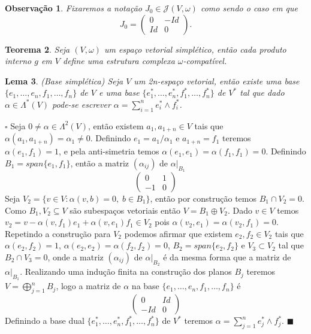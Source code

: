 \documentclass[12pt]{book}
\newtheorem{teorema}{Teorema}[section]
\newtheorem{lema}[teorema]{Lema}
\newtheorem{observacao}[teorema]{Observação}
\newenvironment{prova}[1]{$\square$ #1}{\hfill$\blacksquare$}
\newcommand{\estruturacomplexa}{J_{0}}
\newcommand{\estruturascomplexaspadrao}{\mathcal{J}(V, \omega)}
\newcommand{\vermelho}[1]{{\color{red}#1}}
\begin{document}
	\begin{observacao}\label{observacao_estrutura_complexa}
		Fixaremos a notação $\estruturacomplexa \in \estruturascomplexaspadrao$ como sendo o caso em que
		$$
		\estruturacomplexa=
		\left(
		\begin{array}{cc}
		0 & -Id
		\\
		Id & 0
		\end{array}
		\right).
		$$
	\end{observacao}
	
	\begin{teorema}
		\vermelho{
			Seja $(V, \omega)$ um espaço vetorial simplético, então cada produto interno $g$ em $V$ define uma estrutura complexa $\omega$-compatível.}
	\end{teorema}
	
	\begin{lema}
		(Base simplética) Seja $V$ um 2n-espaço vetorial, então existe uma base $\{ e_{1},\dots, e_{n}, f_{1},\dots, f_{n}\}$ de $V$ e uma base $\{e_{1}^{*}, \dots, e_{n}^{*}, f_{1}^{*}, \dots,f_{n}^{*}\}$ de $V^{*}$ tal que dado $\alpha \in \Lambda^{*}(V)$ pode-se escrever $\alpha = \sum_{i=1}^{n} e^{*}_{i}\wedge f^{*}_{i}$.
	\end{lema}
	\begin{prova}
		Seja $0\neq \alpha \in \Lambda^{2}(V) $, então existem $ a_{1}, a_{1+n} \in V $ tais que $\alpha(a_{1}, a_{1+n}) = \alpha_{1} \neq 0$. Definindo $e_{1} = a_{1}/\alpha_{1}$ e $a_{1+n} = f_{1}$ teremos $\alpha(e_{1}, f_{1}) = 1$, e pela anti-simetria temos $\alpha(e_{1}, e_{1}) = \alpha(f_{1}, f_{1}) = 0$. Definindo $B_{1}=span \{e_{1}, f_{1}\}$, então a matriz $(\alpha_{ij})$ de $\alpha|_{B_{1}}$
		$$
		\left(
		\begin{array}{cc}
		0 & 1
		\\
		-1 & 0
		\end{array}
		\right)
		$$
		Seja  $V_{2} = \{v \in V: \alpha(v, b) = 0,\; b \in B_{1}\}$, então por construção temos $B_{1} \cap V_{2} = 0$. Como $B_{1}, V_{2} \subseteq V$ são subespaços vetoriais então $V = B_{1}\oplus V_{2}$. Dado $v \in V$ temos $v_{2} =v- \alpha(v,f_{1})e_{1} +\alpha(v,e_{1})f_{1} \in V_{2}$ pois $\alpha(v_{2}, e_{1}) = \alpha(v_{2}, f_{1}) = 0$. Repetindo a construção para $V_{2}$ podemos afirmar que existem $e_{2}, f_{2} \in V_{2}$ tais que $\alpha(e_{2}, f_{2}) = 1$, $\alpha(e_{2}, e_{2}) = \alpha(f_{2}, f_{2}) = 0$, $B_{2} = span\{e_{2}, f_{2} \}$ e $V_{3} \subset V_{2}$ tal que $B_{2}\cap V_{3}=0$, onde a matriz $(\alpha_{ij})$ de $\alpha|_{B_{2}}$ é da mesma forma que a matriz de $\alpha|_{B_{1}}$. Realizando uma indução finita na construção dos planos $B_{j}$ teremos $V = \bigoplus_{j=1}^{n}B_{j}$, logo a matriz de $\alpha$ na base  $\{ e_{1},\dots, e_{n}, f_{1},\dots, f_{n}\}$ é
		$$
		\left(
		\begin{array}{cc}
		0 & Id
		\\
		-Id & 0
		\end{array}
		\right)
		$$
		Definindo a base dual $\{e_{1}^{*}, \dots, e_{n}^{*}, f_{1}^{*}, \dots,f_{n}^{*}\}$ de $V^{*}$ teremos $\alpha = \sum_{j=1}^{n}e_{j}^{*}\wedge f_{j}^{*}$.
	\end{prova}
	
\end{document}
